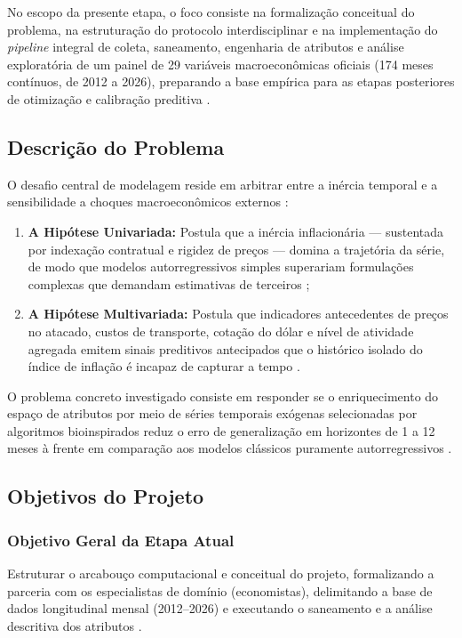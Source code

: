 \documentclass[10pt,twoside]{article}
\begin{document}
No escopo da presente etapa, o foco consiste na formalização conceitual do problema, na estruturação do protocolo interdisciplinar e na implementação do \textit{pipeline} integral de coleta, saneamento, engenharia de atributos e análise exploratória de um painel de 29 variáveis macroeconômicas oficiais (174 meses contínuos, de 2012 a 2026), preparando a base empírica para as etapas posteriores de otimização e calibração preditiva \cite{ref6, ref10}.

\subsection{Descrição do Problema}
O desafio central de modelagem reside em arbitrar entre a inércia temporal e a sensibilidade a choques macroeconômicos externos \cite{ref1, ref6}:
\begin{enumerate}[leftmargin=1.5em]
    \item \textbf{A Hipótese Univariada:} Postula que a inércia inflacionária — sustentada por indexação contratual e rigidez de preços — domina a trajetória da série, de modo que modelos autorregressivos simples superariam formulações complexas que demandam estimativas de terceiros \cite{ref1, ref5};
    \item \textbf{A Hipótese Multivariada:} Postula que indicadores antecedentes de preços no atacado, custos de transporte, cotação do dólar e nível de atividade agregada emitem sinais preditivos antecipados que o histórico isolado do índice de inflação é incapaz de capturar a tempo \cite{ref6, ref14}.
\end{enumerate}

O problema concreto investigado consiste em responder se o enriquecimento do espaço de atributos por meio de séries temporais exógenas selecionadas por algoritmos bioinspirados reduz o erro de generalização em horizontes de 1 a 12 meses à frente em comparação aos modelos clássicos puramente autorregressivos \cite{ref8, ref11, ref18}.

\subsection{Objetivos do Projeto}
\subsubsection{Objetivo Geral da Etapa Atual}
Estruturar o arcabouço computacional e conceitual do projeto, formalizando a parceria com os especialistas de domínio (economistas), delimitando a base de dados longitudinal mensal (2012–2026) e executando o saneamento e a análise descritiva dos atributos \cite{ref7, ref10}.
\end{document}
